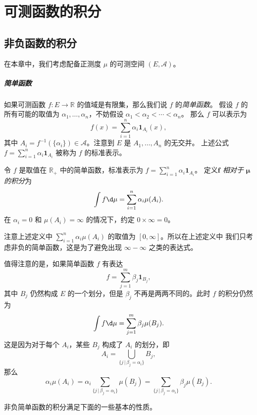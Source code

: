 \documentclass[fontset=none]{Notes}
\begin{document}
\chapter{可测函数的积分}

\section{非负函数的积分}

在本章中，我们考虑配备正测度 $\mu$ 的可测空间 $(E,\mathcal{A})$。

\paragraph{简单函数}
如果可测函数 $f:E\to \mathbb{R}$ 的值域是有限集，那么我们说 $f$ 的\emph{简单函数}。
假设 $f$ 的所有可能的取值为 $\alpha_1,\dots,\alpha_n$，不妨假设 $\alpha_1<\alpha_2<\cdots<\alpha_n$。
那么 $f$ 可以表示为
\[
  f(x)=\sum_{i=1}^n \alpha_i\mathbold 1_{A_i}(x),
\]
其中 $A_i=f^{-1}(\{\alpha_i\})\in \mathcal{A}$。注意到 $E$ 是 $A_1,\dots,A_n$ 的无交并。
上述公式 $f=\sum_{i=1}^n \alpha_i\mathbold 1_{A_i}$ 被称为 $f$ 的标准表示。

\begin{definition}
  令 $f$ 是取值在 $\mathbb{R}_+$ 中的简单函数，标准表示为 $f=\sum_{i=1}^n \alpha_i\mathbold 1_{A_i}$。
  定义\emph{$\mathbold f$ 相对于 $\mathbold\mu$ 的积分}为
  \[
    \int f\d\mu=\sum_{i=1}^n\alpha_i\mu(A_i).
  \]
  在 $\alpha_i=0$ 和 $\mu(A_i)=\infty$ 的情况下，约定 $0\times\infty=0$。
\end{definition}

注意上述定义中 $\sum_{i=1}^n\alpha_i\mu(A_i)$ 的取值为 $[0,\infty]$。所以在上述定义中
我们只考虑非负的简单函数，这是为了避免出现 $\infty-\infty$ 之类的表达式。

值得注意的是，如果简单函数 $f$ 有表达
\[
  f=\sum_{j=1}^m\beta_j\mathbold 1_{B_j},
\]
其中 $B_j$ 仍然构成 $E$ 的一个划分，但是 $\beta_j$ 不再是两两不同的。此时
$f$ 的积分仍然为
\[
  \int f\d\mu=\sum_{j=1}^m\beta_j\mu(B_j).
\]
这是因为对于每个 $A_i$，某些 $B_j$ 构成了 $A_i$ 的划分，即
\[
  A_i=\bigcup_{\{j\,|\,\beta_j=\alpha_i\}}B_j,
\]
那么
\[
  \alpha_i\mu(A_i)=\alpha_i\sum_{\{j\,|\,\beta_j=\alpha_i\}}\mu( B_j)=
  \sum_{\{j\,|\,\beta_j=\alpha_i\}}\beta_j\mu( B_j).
\]

非负简单函数的积分满足下面的一些基本的性质。
\end{document}
